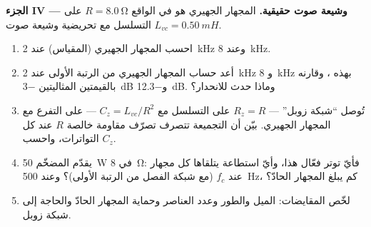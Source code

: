 \begin{problem}
\medskip
\noindent\textbf{الجزء IV --- وشيعة صوت حقيقية.}
المجهار الجهيري هو في الواقع $R = \qty{8.0}{\ohm}$ على التسلسل مع تحريضية
وشيعة صوت $L_{vc} = \qty{0.50}{mH}$.
\begin{enumerate}[resume]
  \item احسب  المجهار الجهيري (المقياس) عند \qty{2}{kHz} وعند
        \qty{8}{kHz}.
  \item أعد حساب  المجهار الجهيري من الرتبة الأولى عند \qty{2}{kHz} و
        \qty{8}{kHz} بهذه ، وقارنه بالقيمتين المثاليتين
        \qty{-3}{dB} و\qty{-12.3}{dB}. وماذا حدث للانحدار؟
  \item تُوصل ``شبكة زوبل'' --- $R_z = R$ على التسلسل مع $C_z =
        L_{vc}/R^2$ --- على التفرع مع المجهار الجهيري. بيّن
        أن التجميعة تتصرف تصرّف مقاومة خالصة $R$ عند كل
        التواترات، واحسب $C_z$.
  \item يقدّم المضخّم \qty{50}{W} في \qty{8}{\ohm}: فأيّ توتر فعّال
        هذا، وأيّ استطاعة يتلقاها كل مجهار عند
        $f_c$ (مع شبكة الفصل من الرتبة الأولى)؟ وعند \qty{500}{Hz}، كم يبلغ
        المجهار الحادّ؟
  \item لخّص المقايضات: الميل والطور وعدد العناصر
        وحماية المجهار الحادّ والحاجة إلى شبكة زوبل.
\end{enumerate}
\end{problem}

